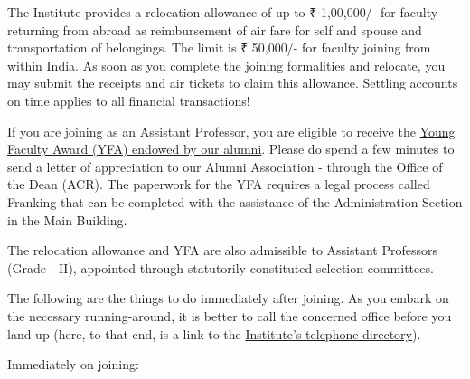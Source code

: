 \documentclass[
  10pt,
  a5paper,
  10pt,
  openany]{amsbook}
\begin{document}
The Institute provides a relocation allowance of up to ₹ 1,00,000/- for
faculty returning from abroad as reimbursement of air fare for self and
spouse and transportation of belongings. The limit is ₹ 50,000/- for
faculty joining from within India. As soon as you complete the joining
formalities and relocate, you may submit the receipts and air tickets to
claim this allowance. Settling accounts on time applies to all financial
transactions!

If you are joining as an Assistant Professor, you are eligible to
receive the
\href{http://www.iitb.ac.in/alumni/en/contribution-purpose/young-faculty-awards}{Young
Faculty Award (YFA) endowed by our alumni}. Please do spend a few
minutes to send a letter of appreciation to our Alumni Association -
through the Office of the Dean (ACR). The paperwork for the YFA requires
a legal process called Franking that can be completed with the
assistance of the Administration Section in the Main Building.

The relocation allowance and YFA are also admissible to Assistant
Professors (Grade - II), appointed through statutorily constituted
selection committees.

The following are the things to do immediately after joining. As you
embark on the necessary running-around, it is better to call the
concerned office before you land up (here, to that end, is a link to the
\href{https://portal.iitb.ac.in/TelephoneDirectory/}{Institute's
telephone directory}).

Immediately on joining:
\end{document}

